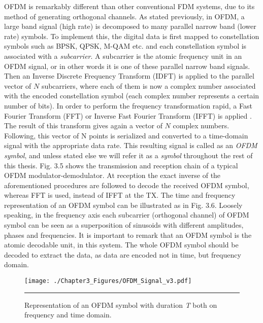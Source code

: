 OFDM is remarkably different than other conventional FDM systems, due to its method of generating orthogonal channels. As stated previously, in OFDM, a large band signal (high rate) is decomposed to many parallel narrow band (lower rate) symbols. To implement this, the digital data is first mapped to constellation symbols such as BPSK, QPSK, M-QAM etc. and each constellation symbol is associated with a \textit{subcarrier}. A subcarrier is the atomic frequency unit in an OFDM signal, or in other words it is one of these parallel narrow band signals. Then an Inverse Discrete Frequency Transform (IDFT) is applied to the parallel vector of $N$ subcarriers, where each of them is now a complex number associated with the encoded constellation symbol (each complex number represents a certain number of bits). In order to perform the frequency transformation rapid, a Fast Fourier Transform (FFT) or Inverse Fast Fourier Transform (IFFT) is applied \cite{james1967historical}. The result of this transform gives again a vector of $N$ complex numbers. Following, this vector of N points is serialized and converted to a time-domain signal with the appropriate data rate. This resulting signal is called as an \textit{OFDM symbol}, and unless stated else we will refer it as a \textit{symbol} throughout the rest of this thesis. Fig. 3.5 shows the transmission and reception chain of a typical OFDM modulator-demodulator. At reception the exact inverse of the aforementioned procedures are followed to decode the received OFDM symbol, whereas FFT is used, instead of IFFT at the TX. The time and frequency representation of an OFDM symbol can be illustrated as in Fig. 3.6. Loosely speaking, in the frequency axis each subcarrier (orthogonal channel) of OFDM symbol can be seen as a superposition of sinusoids with different amplitudes, phases and frequencies. It is important to remark that an OFDM symbol is the atomic decodable unit, in this system. The whole OFDM symbol should be decoded to extract the data, as data are encoded not in time, but frequency domain. 

\begin{figure}[htbp]
  \centering
    \texttt{[image: ./Chapter3\_Figures/OFDM\_Signal\_v3.pdf]}
    \rule{35em}{0.5pt}
  \caption[Representation of an OFDM symbol with duration \textit{T} both on frequency and time domain.]{Representation of an OFDM symbol with duration \textit{T} both on frequency and time domain.}
  \label{fig:Electron}
\end{figure}


